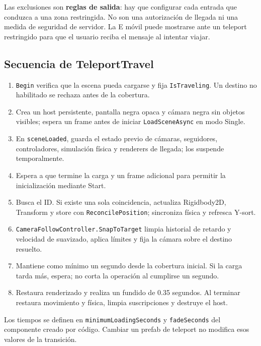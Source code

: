 \documentclass[11pt,letterpaper,oneside]{article}
\newcommand{\code}[1]{\nolinkurl{#1}}
\begin{document}
Las exclusiones son \textbf{reglas de salida}: hay que configurar cada entrada que conduzca a una zona restringida. No son una autorización de llegada ni una medida de seguridad de servidor. La E móvil puede mostrarse ante un teleport restringido para que el usuario reciba el mensaje al intentar viajar.

\subsection{Secuencia de TeleportTravel}
\begin{enumerate}
\item \code{Begin} verifica que la escena pueda cargarse y fija \code{IsTraveling}. Un destino no habilitado se rechaza antes de la cobertura.
\item Crea un host persistente, pantalla negra opaca y cámara negra sin objetos visibles; espera un frame antes de iniciar \code{LoadSceneAsync} en modo Single.
\item En \code{sceneLoaded}, guarda el estado previo de cámaras, seguidores, controladores, simulación física y renderers de llegada; los suspende temporalmente.
\item Espera a que termine la carga y un frame adicional para permitir la inicialización mediante Start.
\item Busca el ID. Si existe una sola coincidencia, actualiza Rigidbody2D, Transform y store con \code{ReconcilePosition}; sincroniza física y refresca Y-sort.
\item \code{CameraFollowController.SnapToTarget} limpia historial de retardo y velocidad de suavizado, aplica límites y fija la cámara sobre el destino resuelto.
\item Mantiene como mínimo un segundo desde la cobertura inicial. Si la carga tarda más, espera; no corta la operación al cumplirse un segundo.
\item Restaura renderizado y realiza un fundido de 0.35 segundos. Al terminar restaura movimiento y física, limpia suscripciones y destruye el host.
\end{enumerate}
Los tiempos se definen en \code{minimumLoadingSeconds} y \code{fadeSeconds} del componente creado por código. Cambiar un prefab de teleport no modifica esos valores de la transición.
\end{document}
